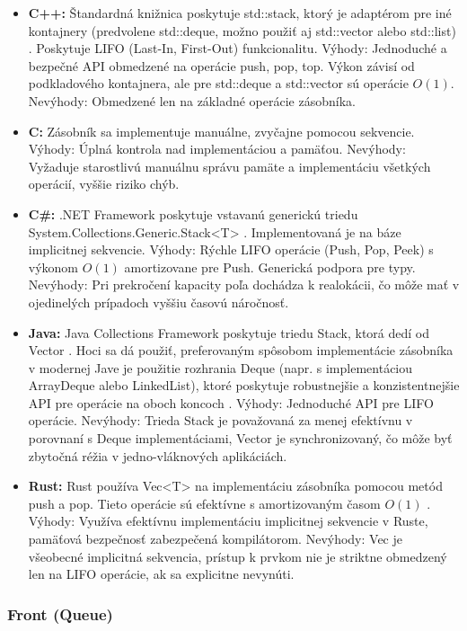 \documentclass[11pt]{article}
\begin{document}
\begin{itemize}
  \item \textbf{C++:} Štandardná knižnica poskytuje std::stack, ktorý je adaptérom pre iné kontajnery (predvolene std::deque, možno použiť aj std::vector alebo std::list) \cite{c++_containers}. Poskytuje LIFO (Last-In, First-Out) funkcionalitu.
  Výhody: Jednoduché a bezpečné API obmedzené na operácie push, pop, top. Výkon závisí od podkladového kontajnera, ale pre std::deque a std::vector sú operácie $O(1)$.
  Nevýhody: Obmedzené len na základné operácie zásobníka.
  \item \textbf{C:} Zásobník sa implementuje manuálne, zvyčajne pomocou sekvencie.
  Výhody: Úplná kontrola nad implementáciou a pamäťou.
  Nevýhody: Vyžaduje starostlivú manuálnu správu pamäte a implementáciu všetkých operácií, vyššie riziko chýb.
  \item \textbf{C\#:} .NET Framework poskytuje vstavanú generickú triedu System.Collections.Generic.Stack<T> \cite{dotnet_docs}. Implementovaná je na báze implicitnej sekvencie.
  Výhody: Rýchle LIFO operácie (Push, Pop, Peek) s výkonom $O(1)$ amortizovane pre Push. Generická podpora pre typy.
  Nevýhody: Pri prekročení kapacity poľa dochádza k realokácii, čo môže mať v ojedinelých prípadoch vyššiu časovú náročnosť.
  \item \textbf{Java:} Java Collections Framework poskytuje triedu Stack, ktorá dedí od Vector \cite{java_docs}. Hoci sa dá použiť, preferovaným spôsobom implementácie zásobníka v modernej Jave je použitie rozhrania Deque (napr. s implementáciou ArrayDeque alebo LinkedList), ktoré poskytuje robustnejšie a konzistentnejšie API pre operácie na oboch koncoch \cite{java_docs}.
  Výhody: Jednoduché API pre LIFO operácie.
  Nevýhody: Trieda Stack je považovaná za menej efektívnu v porovnaní s Deque implementáciami, Vector je synchronizovaný, čo môže byť zbytočná réžia v jedno-vláknových aplikáciách.
  \item \textbf{Rust:} Rust používa Vec<T> na implementáciu zásobníka pomocou metód push a pop. Tieto operácie sú efektívne s amortizovaným časom $O(1)$ \cite{rust_collections}.
  Výhody: Využíva efektívnu implementáciu implicitnej sekvencie v Ruste, pamäťová bezpečnosť zabezpečená kompilátorom.
  Nevýhody: Vec je všeobecné implicitná sekvencia, prístup k prvkom nie je striktne obmedzený len na LIFO operácie, ak sa explicitne nevynúti.
\end{itemize}

\subsubsection*{Front (Queue)}
\end{document}
